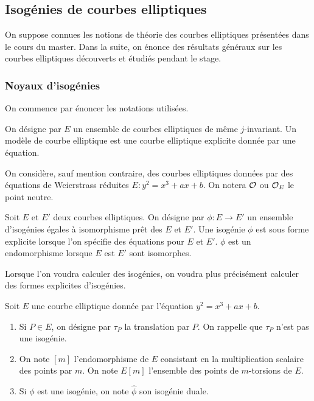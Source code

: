 \subsection{Isogénies de courbes elliptiques}

On suppose connues les notions de théorie des courbes elliptiques présentées dans le cours du master. Dans la suite, on énonce des résultats généraux sur les courbes elliptiques découverts et étudiés pendant le stage.

\subsubsection{Noyaux d'isogénies}

On commence par énoncer les notations utilisées.

\begin{Def}
	On désigne par $E$ un ensemble de courbes elliptiques de même $j$-invariant. Un modèle de courbe elliptique est une courbe elliptique explicite donnée par une équation.
\end{Def}

\begin{Rem}
	On considère, sauf mention contraire, des courbes elliptiques données par des équations de Weierstrass réduites $E : y^2 = x^3 + ax + b$. On notera $\mathcal{O}$ ou $\mathcal{O}_{E}$ le point neutre. 
\end{Rem}

\begin{Def}
	Soit $E$ et $E'$ deux courbes elliptiques. On désigne par $\phi : E\rightarrow E'$ un ensemble d'isogénies égales à isomorphisme prêt des $E$ et $E'$. Une isogénie $\phi$ est sous forme explicite lorsque l'on spécifie des équations pour $E$ et $E'$. $\phi$ est un endomorphisme lorsque $E$ est $E'$ sont isomorphes. 
\end{Def}

\begin{Rem}
	Lorsque l'on voudra calculer des isogénies, on voudra plus précisément calculer des formes explicites d'isogénies.  
\end{Rem}

\begin{Ex} Soit $E$ une courbe elliptique donnée par l'équation $y^2 = x^3 + ax + b$.
	\begin{enumerate}
		\item Si $P\in E$, on désigne par $\tau_{P}$ la translation par $P$. On rappelle que $\tau_{P}$ n'est pas une isogénie. 
		\item On note $[m]$ l'endomorphisme de $E$ consistant en la multiplication scalaire des points par $m$. On note $E[m]$ l'ensemble des points de $m$-torsions de $E$.
		\item Si $\phi$ est une isogénie, on note $\hat{\phi}$ son isogénie duale.
	\end{enumerate}
\end{Ex}

